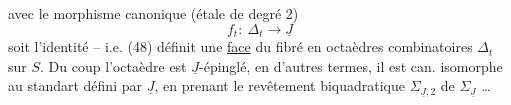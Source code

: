 avec le morphisme canonique (étale de degré 2)
\[
f_t:\ \Delta_t\longrightarrow\underline{J}
\]
soit l'identité -- i.e. (48) définit une \uline{face} du fibré en octaèdres combinatoires $\Delta_t$ sur $S$. Du coup l'octaèdre est $\underline J$-épinglé, en d'autres termes, il est can. isomorphe au  standart défini par $\underline J$,  en prenant le revêtement biquadratique $\Sigma_{\underline J,2}$ de $\Sigma_{\underline J}$ \ldots
